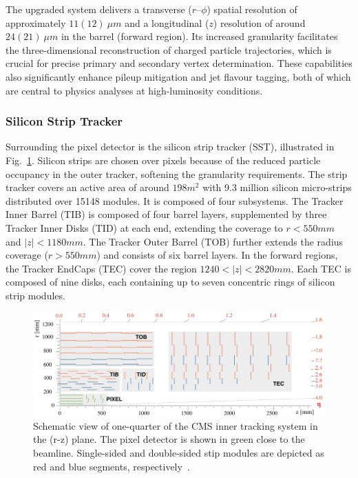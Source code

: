 The upgraded system delivers a transverse ($r$–$\phi$) spatial resolution of approximately $11(12)~\unit{\mu m}$ and a longitudinal ($z$) resolution of around $24(21)~\unit{\mu m}$ in the barrel (forward region). Its increased granularity facilitates the three-dimensional reconstruction of charged particle trajectories, which is crucial for precise primary and secondary vertex determination. These capabilities also significantly enhance pileup mitigation and jet flavour tagging, both of which are central to physics analyses at high-luminosity conditions.

\subsubsection{Silicon Strip Tracker}

Surrounding the pixel detector is the silicon strip tracker (SST), illustrated in Fig.~\ref{Figure:Chapter3_Tracker_Geometry}. Silicon strips are chosen over pixels because of the reduced particle occupancy in the outer tracker, softening the granularity requirements. The strip tracker covers an active area of around $198\unit{m}^2$ with 9.3 million silicon micro-strips distributed over 15148 modules. It is composed of four subsystems. The Tracker Inner Barrel (TIB) is composed of four barrel layers, supplemented by three Tracker Inner Disks (TID) at each end, extending the coverage to $r < 550\unit{mm}$ and $|z| < 1180\unit{mm}$. The Tracker Outer Barrel (TOB) further extends the radius coverage ($r>550\unit{mm}$) and consists of six barrel layers. In the forward regions, the Tracker EndCaps (TEC) cover the region $1240 < |z| < 2820\unit{mm}$. Each TEC is composed of nine disks, each containing up to seven concentric rings of silicon strip modules.

\begin{figure}[h]
\centering
\includegraphics[width= 1\textwidth]{Figures/Chapter3/Phase1_Tracker.pdf}
\caption{Schematic view of one-quarter of the CMS inner tracking system in the (r-z) plane. The pixel detector is shown in green close to the beamline. Single-sided and double-sided stip modules are depicted as red and blue segments, respectively~\cite{CMS_Detector_Run3}. }
\label{Figure:Chapter3_Tracker_Geometry}
\end{figure}

